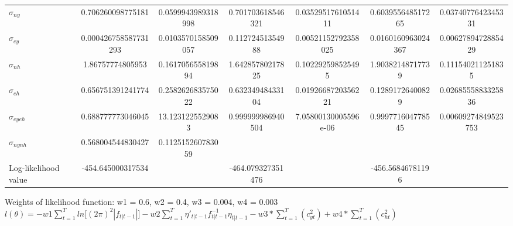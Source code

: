 \documentclass[
  12pt,
]{article}
\begin{document}
\begin{landscape}
\begin{table}[]
\begin{threeparttable}
\begin{tabular}{@{}lSSSSSS@{}}
$\sigma_{ny}$ & 0.706260098775181 & 0.0599943989318998 & 0.701703618546321 & 0.0352951761051411 & 0.603955648517265 & 0.0374077642345331 \\[2pt] 

$\sigma_{ey}$ & 0.000426758587731293 & 0.0103570158509057 & 0.11272451354988 & 0.00521152792358025 & 0.0160160963024367 & 0.0062789472885429 \\[2pt] 

$\sigma_{nh}$ & 1.86757774805953 & 0.161705655819894 & 1.64285780217825 & 0.102292598525495 & 1.90382148717739 & 0.111540211251835 \\[2pt] 

$\sigma_{eh}$ & 0.656751391241774 & 0.258262683575022 & 0.63234948433104 & 0.0192668720356221 & 0.12891726400829 & 0.0268555883325836 \\[2pt] 

$\sigma_{eyeh}$ & 0.688777773046045 & 13.1231225529083 & 0.999999986940504 & 7.05800130005596e-06 & 0.999771604778545 & 0.00609274849523753 \\[2pt] 

$\sigma_{nynh}$ & 0.568004544830427 & 0.112515260783059 &  &  &  &  \\[2pt] 

Log-likelihood value & -454.645000317534 &  & -464.079327351476 &  & -456.56846781196 &  \\[2pt] 


                                        
                    \bottomrule
                \end{tabular}
            \begin{tablenotes}
                \small
                \item Weights of likelihood function: w1 = 0.6, w2 = 0.4, w3 = 0.004, w4 = 0.003\\
                $l(\theta) = -w1\sum_{t=1}^{T}ln\lbrack(2\pi)^2|f_{t|t-1}|\rbrack
                -w2\sum_{t=1}^{T}\eta'_{t|t-1}f^{-1}_{t|t-1}\eta_{t|t-1}
                - w3*\sum_{t=1}^{T}(c_{yt}^2) + w4*\sum_{t=1}^{T}(c_{ht}^2)$
            \end{tablenotes}
            \end{threeparttable}
            \end{table}
            
        \end{landscape}
        
        \clearpage
        
        \pagebreak
        
\end{document}
